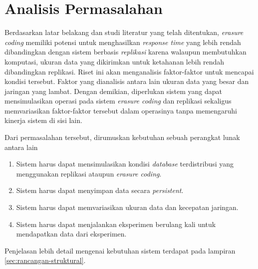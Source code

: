 \section{Analisis Permasalahan}
\label{sec:analisis-permasalahan}


Berdasarkan latar belakang dan studi literatur yang telah ditentukan, \textit{erasure coding} memiliki potensi untuk menghasilkan \textit{response time} yang lebih rendah dibandingkan dengan sistem berbasis \textit{replikasi} karena walaupun membutuhkan komputasi, ukuran data yang dikirimkan untuk ketahanan lebih rendah dibandingkan replikasi. Riset ini akan menganalisis faktor-faktor untuk mencapai kondisi tersebut. Faktor yang dianalisis antara lain ukuran data yang besar dan jaringan yang lambat. Dengan demikian, diperlukan sistem yang dapat mensimulasikan operasi pada sistem \textit{erasure coding} dan replikasi sekaligus memvariasikan faktor-faktor tersebut dalam operasinya tanpa memengaruhi kinerja sistem di sisi lain.

Dari permasalahan tersebut, dirumuskan kebutuhan sebuah perangkat lunak antara lain
\begin{enumerate}

    \item Sistem harus dapat mensimulasikan kondisi \textit{database} terdistribusi yang menggunakan replikasi ataupun \textit{erasure coding}.
    \item Sistem harus dapat menyimpan data secara \textit{persistent}.
    \item Sistem harus dapat memvariasikan ukuran data dan kecepatan jaringan.
    \item Sistem harus dapat menjalankan eksperimen berulang kali untuk mendapatkan data dari eksperimen.

\end{enumerate}

Penjelasan lebih detail mengenai kebutuhan sistem terdapat pada lampiran \ref{sec:rancangan-struktural}.